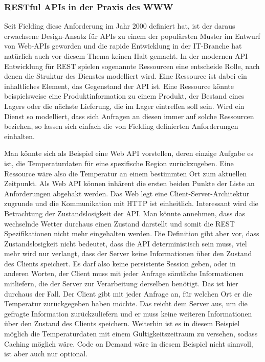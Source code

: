 \subsubsection*{RESTful APIs in der Praxis des WWW}
Seit Fielding diese Anforderung im Jahr 2000 definiert hat, ist der daraus erwachsene Design-Ansatz für APIs zu einem der populärsten Muster im Entwurf von Web-APIs geworden und die rapide Entwicklung in der IT-Branche hat natürlich auch vor diesem Thema keinen Halt gemacht. In der modernen API-Entwicklung für REST spielen sogenannte Ressourcen eine entscheide Rolle, nach denen die Struktur des Dienstes modelliert wird. Eine Ressource ist dabei ein inhaltliches Element, das Gegenstand der API ist. Eine Ressource könnte beispielsweise eine Produktinformation zu einem Produkt, der Bestand eines Lagers oder die nächste Lieferung, die im Lager eintreffen soll sein. \cite[Vgl.][S. 81]{richardson2007web} Wird ein Dienst so modelliert, dass sich Anfragen an diesen immer auf solche Ressourcen beziehen, so lassen sich einfach die von Fielding definierten Anforderungen einhalten.

Man könnte sich als Beispiel eine Web API vorstellen, deren einzige Aufgabe es ist, die Temperaturdaten für eine spezifische Region zurückzugeben. Eine Ressource wäre also die Temperatur an einem bestimmten Ort zum aktuellen Zeitpunkt. Als Web API können inhärent die ersten beiden Punkte der Liste an Anforderungen abgehakt werden. Das Web legt eine Client-Server-Architektur zugrunde und die Kommunikation mit HTTP ist einheitlich. Interessant wird die Betrachtung der Zustandslosigkeit der API. Man könnte annehmen, dass das wechselnde Wetter durchaus einen Zustand darstellt und somit die REST Spezifikationen nicht mehr eingehalten werden. Die Definition gibt aber vor, dass Zustandslosigkeit nicht bedeutet, dass die API deterministisch sein muss, viel mehr wird nur verlangt, dass der Server keine Informationen über den Zustand des Clients speichert. Es darf also keine persistente Session geben, oder in anderen Worten, der Client muss mit jeder Anfrage sämtliche Informationen mitliefern, die der Server zur Verarbeitung derselben benötigt. Das ist hier durchaus der Fall. Der Client gibt mit jeder Anfrage an, für welchen Ort er die Temperatur zurückgegeben haben möchte. Das reicht dem Server aus, um die gefragte Information zurückzuliefern und er muss keine weiteren Informationen über den Zustand des Clients speichern. Weiterhin ist es in diesem Beispiel möglich die Temperaturdaten mit einem Gültigkeitszeitraum zu versehen, sodass Caching möglich wäre. Code on Demand wäre in diesem Beispiel nicht sinnvoll, ist aber auch nur optional.

